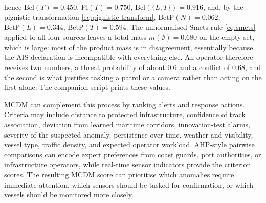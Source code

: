 \begin{example}
hence $\mathrm{Bel}(T)=0.450$, $\mathrm{Pl}(T)=0.750$, $\mathrm{Bel}(\{L,T\})=0.916$, and, by the pignistic transformation \eqref{eq:pignistic-transform}, $\mathrm{BetP}(N)=0.062$, $\mathrm{BetP}(L)=0.344$, $\mathrm{BetP}(T)=0.594$. The unnormalised Smets rule \eqref{eq:smets} applied to all four sources leaves a total mass $m(\emptyset)=0.680$ on the empty set, which is large: most of the product mass is in disagreement, essentially because the AIS declaration is incompatible with everything else. An operator therefore receives two numbers, a threat probability of about $0.6$ and a conflict of $0.68$, and the second is what justifies tasking a patrol or a camera rather than acting on the first alone. The companion script  prints these values.
\end{example}


MCDM can complement this process by ranking alerts and response actions. Criteria may include distance to protected infrastructure, confidence of track association, deviation from learned maritime corridors, innovation-test alarms, severity of the suspected anomaly, persistence over time, weather and visibility, vessel type, traffic density, and expected operator workload. AHP-style pairwise comparisons can encode expert preferences from coast guards, port authorities, or infrastructure operators, while real-time sensor indicators provide the criterion scores. The resulting MCDM score can prioritise which anomalies require immediate attention, which sensors should be tasked for confirmation, or which vessels should be monitored more closely.
